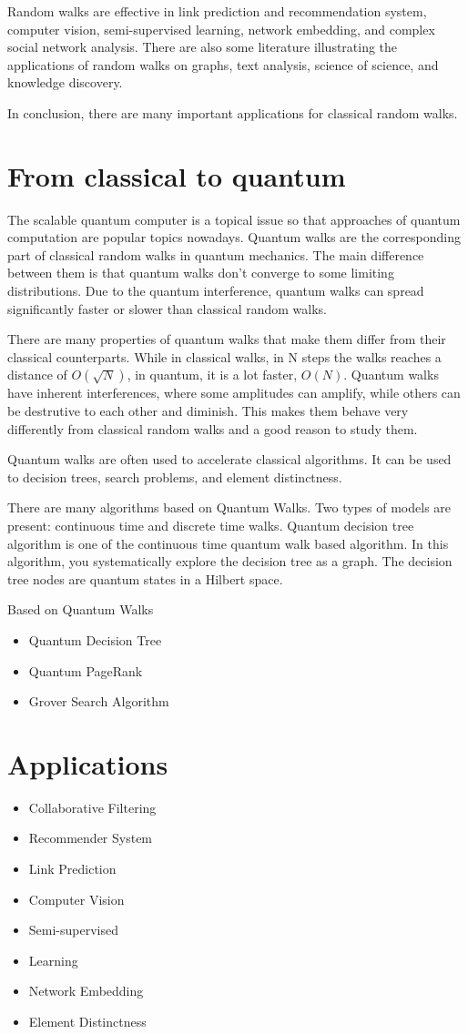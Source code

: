 Random walks are effective in link prediction and recommendation system, computer vision, semi-supervised learning, network embedding, and complex
social network analysis. There are also some literature illustrating the applications of random walks on graphs, text analysis, science of science, and knowledge
discovery.

In conclusion, there are many important applications for classical random walks.

\section{From classical to quantum}

The scalable quantum computer is a topical issue so that approaches of quantum computation are popular topics nowadays. Quantum walks are the corresponding part of classical random walks in quantum mechanics. The main difference between them is that quantum walks don’t converge to some limiting distributions. Due to the quantum interference, quantum walks can spread significantly faster or slower than classical random walks. 

There are many properties of quantum walks that make them differ from their classical counterparts. While in classical walks, in N steps the walks reaches a distance of $O(\sqrt{N})$, in quantum, it is a lot faster, $O(N)$. Quantum walks have inherent interferences, where some amplitudes can amplify, while others can be destrutive to each other and diminish. This makes them behave very differently from classical random walks and a good reason to study them.

Quantum walks are often used to accelerate classical algorithms. It can be used to decision trees, search problems, and element distinctness.

There are many algorithms based on Quantum Walks. Two types of models are present: continuous time and discrete time walks. Quantum decision tree algorithm is one of the continuous time quantum walk based algorithm. In this algorithm, you systematically explore the decision tree as a graph. The decision tree nodes are quantum states in a Hilbert space. 

Based on Quantum Walks
\begin{itemize}
\item Quantum Decision Tree
\item Quantum PageRank
\item Grover Search Algorithm
\end{itemize}

\section{Applications}
\begin{itemize}
\item Collaborative Filtering
\item Recommender System
\item Link Prediction
\item Computer Vision
\item Semi-supervised
\item Learning
\item Network Embedding
\item Element Distinctness
\end{itemize}